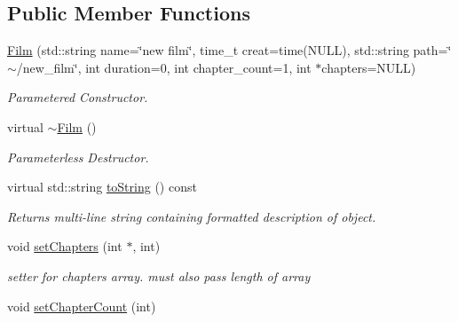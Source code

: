\subsection*{Public Member Functions}
\begin{DoxyCompactItemize}
\item 
\hypertarget{classFilm_a6ea805a054e1f43ec3963daf58ac7dd4}{\hyperlink{classFilm_a6ea805a054e1f43ec3963daf58ac7dd4}{Film} (std\-::string name=\char`\"{}new film\char`\"{}, time\-\_\-t creat=time(N\-U\-L\-L), std\-::string path=\char`\"{}$\sim$/new\-\_\-film\char`\"{}, int duration=0, int chapter\-\_\-count=1, int $\ast$chapters=N\-U\-L\-L)}\label{classFilm_a6ea805a054e1f43ec3963daf58ac7dd4}

\begin{DoxyCompactList}\small\item\em Parametered Constructor. \end{DoxyCompactList}\item 
virtual \hyperlink{classFilm_a8dab653f8a6c0635ca5ddbe0bbdd9a25}{$\sim$\-Film} ()
\begin{DoxyCompactList}\small\item\em Parameterless Destructor. \end{DoxyCompactList}\item 
\hypertarget{classFilm_ab88f7ac028cd45da81c96a50a2990fee}{virtual std\-::string \hyperlink{classFilm_ab88f7ac028cd45da81c96a50a2990fee}{to\-String} () const }\label{classFilm_ab88f7ac028cd45da81c96a50a2990fee}

\begin{DoxyCompactList}\small\item\em Returns multi-\/line string containing formatted description of object. \end{DoxyCompactList}\item 
\hypertarget{classFilm_a7cce5e45c3506a2b4150d43e3cba6813}{void \hyperlink{classFilm_a7cce5e45c3506a2b4150d43e3cba6813}{set\-Chapters} (int $\ast$, int)}\label{classFilm_a7cce5e45c3506a2b4150d43e3cba6813}

\begin{DoxyCompactList}\small\item\em setter for chapters array. must also pass length of array \end{DoxyCompactList}\item 
\hypertarget{classFilm_a019b6375e91a6d6322a19a81de3b965d}{void \hyperlink{classFilm_a019b6375e91a6d6322a19a81de3b965d}{set\-Chapter\-Count} (int)}\label{classFilm_a019b6375e91a6d6322a19a81de3b965d}


\end{DoxyCompactItemize}
